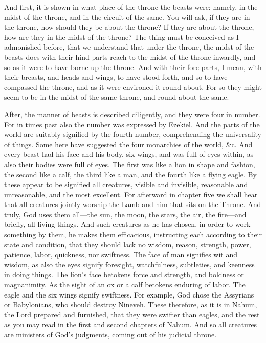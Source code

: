 And first, it is shown in what place of the throne the beasts were: namely, in the midst of the throne, and in the circuit of the same. You will ask, if they are in the throne, how should they be about the throne? If they are about the throne, how are they in the midst of the throne? The thing must be conceived as I admonished before, that we understand that under the throne, the midst of the beasts does with their hind parts reach to the midst of the throne inwardly, and so as it were to have borne up the throne. And with their fore parts, I mean, with their breasts, and heads and wings, to have stood forth, and so to have compassed the throne, and as it were environed it round about. For so they might seem to be in the midst of the same throne, and round about the same.

After, the manner of beasts is described diligently, and they were four in number. For in times past also the number was expressed by Ezekiel. And the parts of the world are suitably signified by the fourth number, comprehending the universality of things. Some here have suggested the four monarchies of the world, \&c. And every beast had his face and his body, six wings, and was full of eyes within, as also their bodies were full of eyes. The first was like a lion in shape and fashion, the second like a calf, the third like a man, and the fourth like a flying eagle. By these appear to be signified all creatures, visible and invisible, reasonable and unreasonable, and the most excellent. For afterward in chapter five we shall hear that all creatures jointly worship the Lamb and him that sits on the Throne. And truly, God uses them all—the sun, the moon, the stars, the air, the fire—and briefly, all living things. And such creatures as he has chosen, in order to work something by them, he makes them efficacious, instructing each according to their state and condition, that they should lack no wisdom, reason, strength, power, patience, labor, quickness, nor swiftness. The face of man signifies wit and wisdom, as also the eyes signify foresight, watchfulness, subtleties, and keenness in doing things. The lion’s face betokens force and strength, and boldness or magnanimity. As the sight of an ox or a calf betokens enduring of labor. The eagle and the six wings signify swiftness. For example, God chose the Assyrians or Babylonians, who should destroy Nineveh. These therefore, as it is in Nahum, the Lord prepared and furnished, that they were swifter than eagles, and the rest as you may read in the first and second chapters of Nahum. And so all creatures are ministers of God’s judgments, coming out of his judicial throne.

